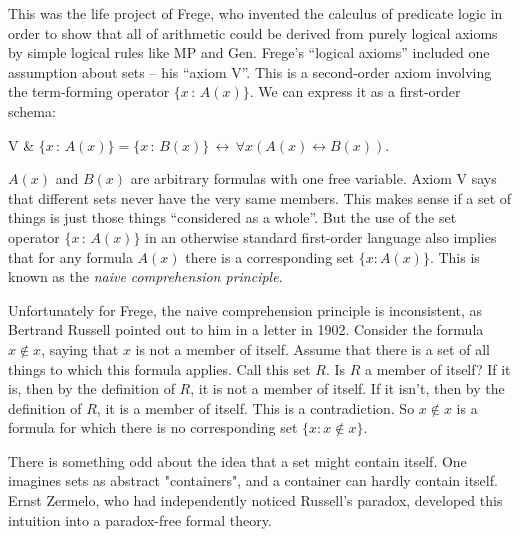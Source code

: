 This was the life project of Frege,
who invented the calculus of predicate logic in order
to show that all of arithmetic could be derived from purely logical axioms
by simple logical rules like MP and Gen.
Frege's ``logical axioms'' included one assumption about sets
-- his ``axiom V''.
This is a second-order axiom involving
the term-forming operator $\{ x \,:\, A(x) \}$.
We can express it as a first-order schema:

\begin{axioms}
  V & $\{ x \,:\, A(x) \} = \{ x \,:\, B(x) \} \,\leftrightarrow\, \forall x (A(x) \leftrightarrow B(x)).$
\end{axioms}

\noindent%
$A(x)$ and $B(x)$ are arbitrary formulas with one free variable.
Axiom V says that different sets never have the very same members.
This makes sense if a set of things is just those things ``considered as a whole''.
But the use of
the set operator $\{ x \,:\, A(x) \}$ in an otherwise standard first-order language
also implies that for any formula $A(x)$ there is a corresponding set $\{ x : A(x) \}$.
This is known as the \emph{naive comprehension principle}.



Unfortunately for Frege,
the naive comprehension principle is inconsistent,
as Bertrand Russell pointed out to him in a letter in 1902.
Consider the formula $x \not\in x$,
saying that $x$ is not a member of itself.
Assume that there is a set of all things to which this formula applies.
Call this set $R$.
Is $R$ a member of itself?
If it is, then by the definition of $R$,
it is not a member of itself.
If it isn't, then by the definition of $R$,
it is a member of itself.
This is a contradiction.
So $x \not\in x$ is a formula for which there is no corresponding set $\{ x : x \not\in x \}$.

There is something odd about the idea that a set might contain itself.
One imagines sets as abstract "containers",
and a container can hardly contain itself.
Ernst Zermelo,
who had independently noticed Russell's paradox,
developed this intuition into a paradox-free formal theory.

